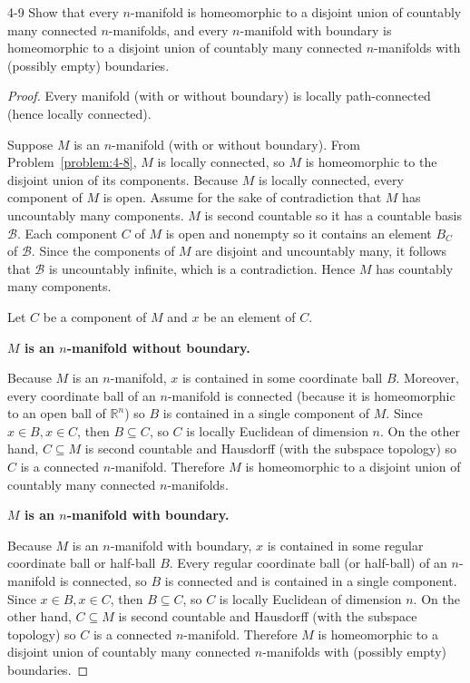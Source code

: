\begin{problem}{4-9}\label{problem:4-9}
Show that every $n$-manifold is homeomorphic to a disjoint union of countably many connected $n$-manifolds, and every $n$-manifold with boundary is homeomorphic to a disjoint union of countably many connected $n$-manifolds with (possibly empty) boundaries.
\end{problem}

\begin{proof}
	Every manifold (with or without boundary) is locally path-connected (hence locally connected).

	Suppose $M$ is an $n$-manifold (with or without boundary). From Problem~\ref{problem:4-8}, $M$ is locally connected, so $M$ is homeomorphic to the disjoint union of its components. Because $M$ is locally connected, every component of $M$ is open. Assume for the sake of contradiction that $M$ has uncountably many components. $M$ is second countable so it has a countable basis $\mathscr{B}$. Each component $C$ of $M$ is open and nonempty so it contains an element $B_{C}$ of $\mathscr{B}$. Since the components of $M$ are disjoint and uncountably many, it follows that $\mathscr{B}$ is uncountably infinite, which is a contradiction. Hence $M$ has countably many components.

	Let $C$ be a component of $M$ and $x$ be an element of $C$.

	\textbf{$M$ is an $n$-manifold without boundary.}

	Because $M$ is an $n$-manifold, $x$ is contained in some coordinate ball $B$. Moreover, every coordinate ball of an $n$-manifold is connected (because it is homeomorphic to an open ball of $\mathbb{R}^{n}$) so $B$ is contained in a single component of $M$. Since $x\in B, x\in C$, then $B \subseteq C$, so $C$ is locally Euclidean of dimension $n$. On the other hand, $C\subseteq M$ is second countable and Hausdorff (with the subspace topology) so $C$ is a connected $n$-manifold. Therefore $M$ is homeomorphic to a disjoint union of countably many connected $n$-manifolds.

	\textbf{$M$ is an $n$-manifold with boundary.}

	Because $M$ is an $n$-manifold with boundary, $x$ is contained in some regular coordinate ball or half-ball $B$. Every regular coordinate ball (or half-ball) of an $n$-manifold is connected, so $B$ is connected and is contained in a single component. Since $x\in B, x\in C$, then $B\subseteq C$, so $C$ is locally Euclidean of dimension $n$. On the other hand, $C\subseteq M$ is second countable and Hausdorff (with the subspace topology) so $C$ is a connected $n$-manifold. Therefore $M$ is homeomorphic to a disjoint union of countably many connected $n$-manifolds with (possibly empty) boundaries.
\end{proof}


